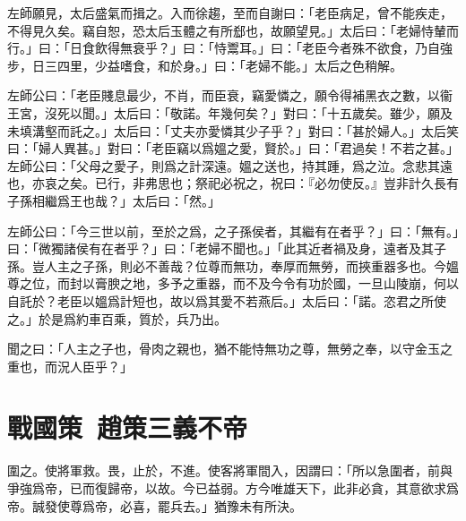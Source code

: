 左師願見，太后盛氣而揖之。入而徐趨，至而自謝曰：「老臣病足，曾不能疾走，不得見久矣。竊自恕，恐太后玉體之有所郄也，故願望見。」太后曰：「老婦恃輦而行。」曰：「日食飲得無衰乎？」曰：「恃鬻耳。」曰：「老臣今者殊不欲食，乃自強步，日三四里，少益嗜食，和於身。」曰：「老婦不能。」太后之色稍解。

左師公曰：「老臣賤息最少，不肖，而臣衰，竊愛憐之，願令得補黑衣之數，以衞王宮，沒死以聞。」太后曰：「敬諾。年幾何矣？」對曰：「十五歲矣。雖少，願及未填溝壑而託之。」太后曰：「丈夫亦愛憐其少子乎？」對曰：「甚於婦人。」太后笑曰：「婦人異甚。」對曰：「老臣竊以爲媼之愛，賢於。」曰：「君過矣！不若之甚。」左師公曰：「父母之愛子，則爲之計深遠。媼之送也，持其踵，爲之泣。念悲其遠也，亦哀之矣。已行，非弗思也；祭祀必祝之，祝曰：『必勿使反。』豈非計久長有子孫相繼爲王也哉？」太后曰：「然。」

左師公曰：「今三世以前，至於之爲，之子孫侯者，其繼有在者乎？」曰：「無有。」曰：「微獨諸侯有在者乎？」曰：「老婦不聞也。」「此其近者禍及身，遠者及其子孫。豈人主之子孫，則必不善哉？位尊而無功，奉厚而無勞，而挾重器多也。今媼尊之位，而封以膏腴之地，多予之重器，而不及今令有功於國，一旦山陵崩，何以自託於？老臣以媼爲計短也，故以爲其愛不若燕后。」太后曰：「諾。恣君之所使之。」於是爲約車百乘，質於，兵乃出。

聞之曰：「人主之子也，骨肉之親也，猶不能恃無功之尊，無勞之奉，以守金玉之重也，而況人臣乎？」

\section[魯仲連義不帝秦\quad{\small 戰國策\ 趙策三}]{{\normalsize 戰國策\ 趙策三}\quad {}義不帝}
圍之。使將軍救。畏，止於，不進。使客將軍間入，因謂曰：「所以急圍者，前與爭強爲帝，已而復歸帝，以故。今已益弱。方今唯雄天下，此非必貪，其意欲求爲帝。誠發使尊爲帝，必喜，罷兵去。」猶豫未有所決。

